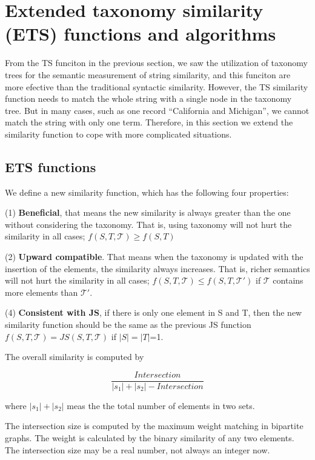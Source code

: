 
\section{Extended taxonomy similarity (ETS) functions and algorithms}

From the TS funciton in the previous section, we saw the utilization of taxonomy trees for the semantic measurement of string similarity, and this funciton are more efective than the traditional syntactic similarity. However, the TS similarity function needs to match the whole string with a single node in the taxonomy tree. But in many cases, such as one record ``California and Michigan'', we cannot match the string with only one term. Therefore, in this section we extend the similarity function to cope with more complicated situations.



\subsection{ETS functions}

We define a new similarity function, which has the following four properties:

(1)\textbf{ Beneficial}, that means the new similarity is always greater than the one without considering the taxonomy. That is, using taxonomy will not hurt the similarity in all cases; $f(S,T,\mathcal{T} ) \geq  f(S,T) $

(2) \textbf{Upward compatible}. That means when the taxonomy is updated with the insertion of the elements, the similarity always increases. That is, richer semantics will not hurt the similarity in all cases; $f(S,T,\mathcal{T} ) \leq  f(S,T, \mathcal{T'}) $ if $\mathcal{T}$ contains more elements than $\mathcal{T'}$.

(4) \textbf{Consistent with JS}, if there is only one element in S and T, then the new similarity function should be the same as the previous JS function $f(S,T,\mathcal{T} ) =  JS(S,T,\mathcal{T}) $ if $|S|=|T|$=1.

The overall similarity is computed by

\begin{equation}
\frac{Intersection}{|s_1|+|s_2| - Intersection}
\end{equation}

 where $|s_1|+|s_2|$  meas the the total number of elements in two sets.


The intersection size is computed by the maximum weight matching in bipartite graphs. The weight is calculated by the binary similarity of any two elements. The intersection size may be a real number, not always an integer now.

